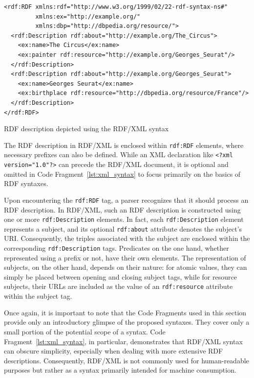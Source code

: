 \begin{itemize}
    \begin{listing}[htbp]
        \begin{verbatim}
<rdf:RDF xmlns:rdf="http://www.w3.org/1999/02/22-rdf-syntax-ns#"
         xmlns:ex="http://example.org/"
         xmlns:dbp="http://dbpedia.org/resource/">
  <rdf:Description rdf:about="http://example.org/The_Circus">
    <ex:name>The Circus</ex:name>
    <ex:painter rdf:resource="http://example.org/Georges_Seurat"/>
  </rdf:Description>
  <rdf:Description rdf:about="http://example.org/Georges_Seurat">
    <ex:name>Georges Seurat</ex:name>
    <ex:birthplace rdf:resource="http://dbpedia.org/resource/France"/>
  </rdf:Description>
</rdf:RDF>
        \end{verbatim}
        \caption{RDF description depicted using the RDF/XML syntax}
        \label{lst:xml_syntax}
    \end{listing}

    The RDF description in RDF/XML is enclosed within \texttt{rdf:RDF} elements, where necessary prefixes can also be defined. While an XML declaration like \texttt{<?xml version="1.0"?>} can precede the RDF/XML document, it is optional and omitted in Code Fragment~\ref{lst:xml_syntax} to focus primarily on the basics of RDF syntaxes. \citep{gandon2014xml}

    Upon encountering the \texttt{rdf:RDF} tag, a parser recognizes that it should process an RDF description. In RDF/XML, such an RDF description is constructed using one or more \texttt{rdf:Description} elements. In fact, each \texttt{rdf:Description} element represents a subject, and its optional \texttt{rdf:about} attribute denotes the subject's URI. Consequently, the triples associated with the subject are enclosed within the corresponding \texttt{rdf:Description} tags. Predicates on the one hand, whether represented using a prefix or not, have their own elements. The representation of subjects, on the other hand, depends on their nature: for atomic values, they can simply be placed between opening and closing subject tags, while for resource subjects, their URLs are included as the value of an \texttt{rdf:resource} attribute within the subject tag. \citep{gandon2014xml}

    Once again, it is important to note that the Code Fragments used in this section provide only an introductory glimpse of the proposed syntaxes. They cover only a small portion of the potential scope of a syntax. Code Fragment~\ref{lst:xml_syntax}, in particular, demonstrates that RDF/XML syntax can obscure simplicity, especially when dealing with more extensive RDF descriptions. Consequently, RDF/XML is not commonly used for human-readable purposes but rather as a syntax primarily intended for machine consumption. \citep{dongo2019srdf}


\end{itemize}
